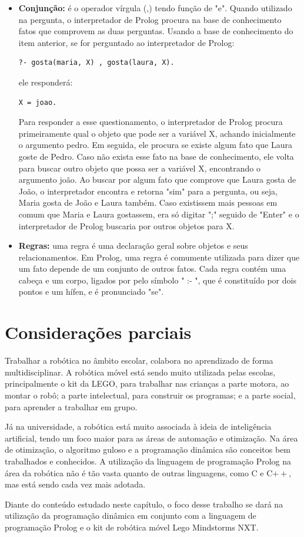 \begin{itemize}
\item \textbf{Conjunção:} é o operador vírgula (,) tendo função de "e". Quando utilizado na pergunta, o interpretador de Prolog procura na base de conhecimento fatos que comprovem as duas perguntas. Usando a base de conhecimento do item anterior, se for perguntado ao interpretador de Prolog: 
\lstset{language=Prolog}
\begin{lstlisting}
?- gosta(maria, X) , gosta(laura, X).
\end{lstlisting}
ele responderá:
\lstset{language=Prolog}
\begin{lstlisting}
X = joao.
\end{lstlisting}
Para responder a esse questionamento, o interpretador de Prolog procura primeiramente qual o objeto que pode ser a variável X, achando inicialmente o argumento pedro. Em seguida, ele procura se existe algum fato que Laura goste de Pedro. Caso não exista esse fato na base de conhecimento, ele volta para buscar outro objeto que possa ser a variável X, encontrando o argumento joão. Ao buscar por algum fato que comprove que Laura gosta de João, o interpretador encontra e retorna "sim" para a pergunta, ou seja, Maria gosta de João e Laura também. Caso existissem mais pessoas em comum que Maria e Laura gostassem, era só digitar ";" seguido de "Enter" e o interpretador de Prolog buscaria por outros objetos para X.
\item \textbf{Regras:} uma regra é uma declaração geral sobre objetos e seus relacionamentos. Em Prolog, uma regra é comumente utilizada para dizer que um fato depende de um conjunto de outros fatos. Cada regra contém uma cabeça e um corpo, ligados por pelo símbolo " :- ", que é constituído por dois pontos e um hífen, e é pronunciado "se". 
\end{itemize}

\section{Considerações parciais}
Trabalhar a robótica no âmbito escolar, colabora no aprendizado de forma multidisciplinar. A robótica móvel está sendo muito utilizada pelas escolas, principalmente o kit da LEGO, para trabalhar nas crianças a parte motora, ao montar o robô; a parte intelectual, para construir os programas; e a parte social, para aprender a trabalhar em grupo.

Já na universidade, a robótica está muito associada à ideia de inteligência artificial, tendo um foco maior para as áreas de automação e otimização. Na área de otimização, o algoritmo guloso e a programação dinâmica são conceitos bem trabalhados e conhecidos. A utilização da linguagem de programação Prolog na área da robótica não é tão vasta quanto de outras linguagens, como C e C$++$, mas está sendo cada vez mais adotada. 

Diante do conteúdo estudado neste capítulo, o foco desse trabalho se dará na utilização da programação dinâmica em conjunto com a linguagem de programação Prolog e o kit de robótica móvel Lego Mindstorms NXT. 